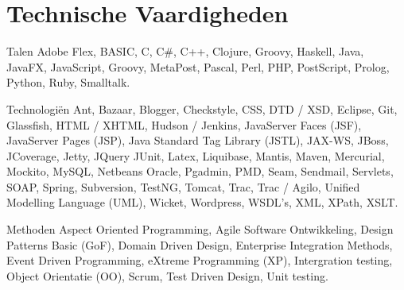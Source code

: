 \section*{Technische Vaardigheden}

	\begin{skillList}
		\item[Talen] Adobe Flex, BASIC, C, C\#, C++, Clojure, Groovy, Haskell, 
		Java, JavaFX, JavaScript, Groovy, MetaPost, Pascal, Perl, PHP, PostScript, 
		Prolog, Python, Ruby, Smalltalk.\hfill\\
		
		\item[Technologi\"en] Ant, Bazaar, Blogger, Checkstyle, CSS, DTD / XSD, 
		Eclipse, Git, Glassfish, HTML / XHTML, Hudson / Jenkins, 
		JavaServer Faces (JSF), JavaServer Pages (JSP), 
		Java Standard Tag Library (JSTL), JAX-WS, JBoss, JCoverage, Jetty, JQuery
		JUnit, Latex, Liquibase, Mantis, Maven, Mercurial, Mockito, MySQL, Netbeans
		Oracle, Pgadmin, PMD, Seam, Sendmail, Servlets, SOAP, Spring, Subversion,
		TestNG, Tomcat, Trac, Trac / Agilo, Unified Modelling Language (UML),
		Wicket, Wordpress, WSDL's, XML, XPath, XSLT.\hfill\\
		
		\item[Methoden] Aspect Oriented Programming, Agile Software Ontwikkeling,
		Design Patterns Basic (GoF), Domain Driven Design, 
		Enterprise Integration Methods, Event Driven Programming, 
		eXtreme Programming (XP), Intergration testing, Object Orientatie (OO), 
		Scrum, Test Driven Design, Unit testing.\hfill\\
		
	\end{skillList}
